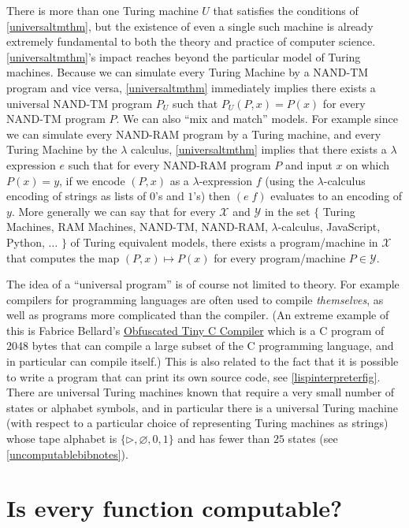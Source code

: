 There is more than one Turing machine \(U\) that satisfies the
conditions of \cref{universaltmthm}, but the existence of even a single
such machine is already extremely fundamental to both the theory and
practice of computer science. \cref{universaltmthm}'s impact reaches
beyond the particular model of Turing machines. Because we can simulate
every Turing Machine by a NAND-TM program and vice versa,
\cref{universaltmthm} immediately implies there exists a universal
NAND-TM program \(P_U\) such that \(P_U(P,x)=P(x)\) for every NAND-TM
program \(P\). We can also ``mix and match'' models. For example since
we can simulate every NAND-RAM program by a Turing machine, and every
Turing Machine by the \(\lambda\) calculus, \cref{universaltmthm}
implies that there exists a \(\lambda\) expression \(e\) such that for
every NAND-RAM program \(P\) and input \(x\) on which \(P(x)=y\), if we
encode \((P,x)\) as a \(\lambda\)-expression \(f\) (using the
\(\lambda\)-calculus encoding of strings as lists of \(0\)'s and
\(1\)'s) then \((e\; f)\) evaluates to an encoding of \(y\). More
generally we can say that for every \(\mathcal{X}\) and \(\mathcal{Y}\)
in the set \(\{\) Turing Machines, RAM Machines, NAND-TM, NAND-RAM,
\(\lambda\)-calculus, JavaScript, Python, \(\ldots\) \(\}\) of Turing
equivalent models, there exists a program/machine in \(\mathcal{X}\)
that computes the map \((P,x) \mapsto P(x)\) for every program/machine
\(P \in \mathcal{Y}\).

The idea of a ``universal program'' is of course not limited to theory.
For example compilers for programming languages are often used to
compile \emph{themselves}, as well as programs more complicated than the
compiler. (An extreme example of this is Fabrice Bellard's
\href{https://bellard.org/otcc/}{Obfuscated Tiny C Compiler} which is a
C program of 2048 bytes that can compile a large subset of the C
programming language, and in particular can compile itself.) This is
also related to the fact that it is possible to write a program that can
print its own source code, see \cref{lispinterpreterfig}. There are
universal Turing machines known that require a very small number of
states or alphabet symbols, and in particular there is a universal
Turing machine (with respect to a particular choice of representing
Turing machines as strings) whose tape alphabet is
\(\{ \triangleright, \varnothing, 0, 1 \}\) and has fewer than \(25\)
states (see \cref{uncomputablebibnotes}).

\section{Is every function computable?}\label{Is-every-function-computa}

